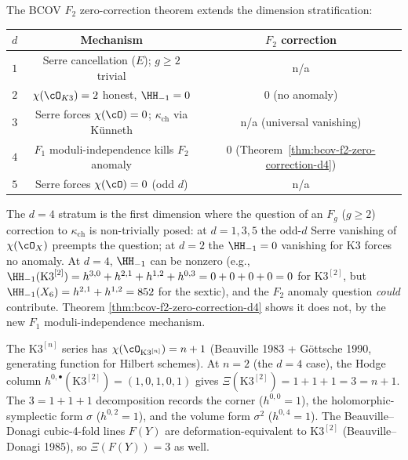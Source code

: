 \begin{remark}
\label{rem:cy-strat-d4-cross-d-mechanisms}
The BCOV $F_2$ zero-correction theorem extends the dimension
stratification:

\begin{center}
\begin{tabular}{ccc}
\toprule
$d$ & Mechanism & $F_2$ correction \\
\midrule
$1$ & Serre cancellation ($E$); $g \geq 2$ trivial & n/a \\
$2$ & $\chi(\cO_{K3}) = 2$ honest, $\HH_{-1} = 0$ &
$0$ (no anomaly) \\
$3$ & Serre forces $\chi(\cO) = 0$; $\kappa_{\mathrm{ch}}$ via K\"unneth &
n/a (universal vanishing) \\
$4$ & $F_1$ moduli-independence kills $F_2$ anomaly &
$0$ (Theorem~\ref{thm:bcov-f2-zero-correction-d4}) \\
$5$ & Serre forces $\chi(\cO) = 0$ (odd $d$) & n/a \\
\bottomrule
\end{tabular}
\end{center}

The $d = 4$ stratum is the first dimension where the question of an $F_g$
($g \geq 2$) correction to $\kappa_{\mathrm{ch}}$ is non-trivially
posed: at $d = 1, 3, 5$ the odd-$d$ Serre vanishing of $\chi(\cO_X)$
preempts the question; at $d = 2$ the $\HH_{-1} = 0$ vanishing for K3
forces no anomaly. At $d = 4$, $\HH_{-1}$ can be nonzero
(e.g., $\HH_{-1}(\mathrm{K3}^{[2]}) = h^{3,0} + h^{2,1} + h^{1,2} +
h^{0,3} = 0 + 0 + 0 + 0 = 0$ for $\mathrm{K3}^{[2]}$, but
$\HH_{-1}(X_6) = h^{2,1} + h^{1,2} = 852$ for the sextic), and the
$F_2$ anomaly question \emph{could} contribute. Theorem
\ref{thm:bcov-f2-zero-correction-d4} shows it does not, by the new
$F_1$ moduli-independence mechanism.
\end{remark}

\begin{remark}
\label{rem:cy-strat-d4-n-plus-1}
The $\mathrm{K3}^{[n]}$ series has $\chi(\cO_{\mathrm{K3}^{[n]}}) = n + 1$
(Beauville 1983 + G\"ottsche 1990, generating function for Hilbert
schemes). At $n = 2$ (the $d = 4$ case), the Hodge column
$h^{0,\bullet}(\mathrm{K3}^{[2]}) = (1, 0, 1, 0, 1)$ gives
$\Xi(\mathrm{K3}^{[2]}) = 1 + 1 + 1 = 3 = n + 1$. The $3 = 1 + 1 + 1$
decomposition records the corner ($h^{0,0} = 1$), the
holomorphic-symplectic form $\sigma$ ($h^{0,2} = 1$), and the volume
form $\sigma^2$ ($h^{0,4} = 1$). The Beauville--Donagi cubic-4-fold
lines $F(Y)$ are deformation-equivalent to $\mathrm{K3}^{[2]}$
(Beauville--Donagi 1985), so $\Xi(F(Y)) = 3$ as well.
\end{remark}

